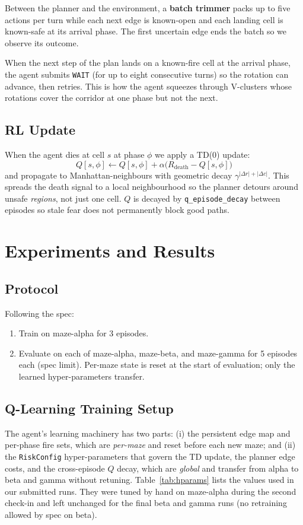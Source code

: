 \documentclass[11pt]{article}
\begin{document}
Between the planner and the environment, a \textbf{batch trimmer}
packs up to five actions per turn while each next edge is known-open
and each landing cell is known-safe at its arrival phase.  The first
uncertain edge ends the batch so we observe its outcome.

When the next step of the plan lands on a known-fire cell at the
arrival phase, the agent submits \texttt{WAIT} (for up to eight
consecutive turns) so the rotation can advance, then retries.  This is
how the agent squeezes through V-clusters whose rotations cover the
corridor at one phase but not the next.

\subsection{RL Update}
When the agent dies at cell $s$ at phase $\phi$ we apply a TD(0) update:
\[
Q[s,\phi] \leftarrow Q[s,\phi] + \alpha\bigl(R_\text{death} - Q[s,\phi]\bigr)
\]
and propagate to Manhattan-neighbours with geometric decay
$\gamma^{|\Delta r|+|\Delta c|}$.  This spreads the death signal to
a local neighbourhood so the planner detours around unsafe
\emph{regions}, not just one cell.  $Q$ is decayed by
\texttt{q\_episode\_decay} between episodes so stale fear does not
permanently block good paths.

\section{Experiments and Results}

\subsection{Protocol}
Following the spec:
\begin{enumerate}[itemsep=0.2em]
  \item Train on maze-alpha for 3 episodes.
  \item Evaluate on each of maze-alpha, maze-beta, and maze-gamma for
    5 episodes each (spec limit).  Per-maze state is reset at the start
    of evaluation; only the learned hyper-parameters transfer.
\end{enumerate}

\subsection{Q-Learning Training Setup}

The agent's learning machinery has two parts:
(i) the persistent edge map and per-phase fire sets, which are
\emph{per-maze} and reset before each new maze; and
(ii) the \texttt{RiskConfig} hyper-parameters that govern the TD
update, the planner edge costs, and the cross-episode $Q$ decay,
which are \emph{global} and transfer from alpha to beta and gamma
without retuning.  Table~\ref{tab:hparams} lists the values used in
our submitted runs.  They were tuned by hand on maze-alpha during the
second check-in and left unchanged for the final beta and gamma runs
(no retraining allowed by spec on beta).
\end{document}
